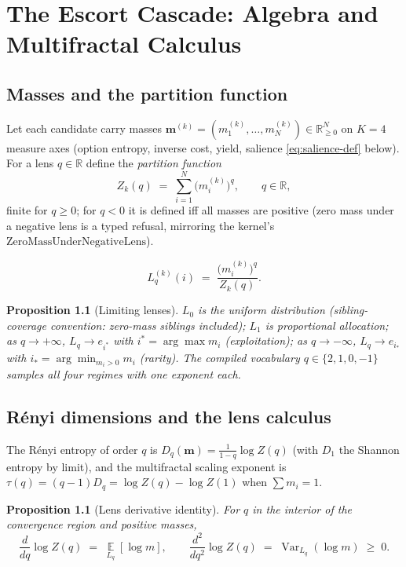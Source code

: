 \documentclass[12pt,oneside]{report}
\theoremstyle{plain}
\newtheorem{proposition}[theorem]{Proposition}
\theoremstyle{definition}
\theoremstyle{remark}
\newcommand{\R}{\mathbb{R}}
\newcommand{\E}{\operatorname*{\mathbb{E}}}
\newcommand{\Var}{\operatorname{Var}}
\newcommand{\escort}[1]{L_{#1}}
\newcommand{\mass}{\mathbf{m}}
\begin{document}
\chapter{The Escort Cascade: Algebra and Multifractal Calculus}
\label{ch:escort}

\section{Masses and the partition function}

Let each candidate carry masses
$\mass^{(k)}=(m^{(k)}_1,\dots,m^{(k)}_N)\in\R_{\ge0}^N$ on $K=4$
measure axes (option entropy, inverse cost, yield, salience
\eqref{eq:salience-def} below). For a lens $q\in\R$ define the
\emph{partition function}
\begin{equation}
Z_k(q) \;=\; \sum_{i=1}^{N} \bigl(m^{(k)}_i\bigr)^{q},
\qquad q\in\R,
\end{equation}
finite for $q\ge 0$; for $q<0$ it is defined iff all masses are
positive (zero mass under a negative lens is a typed refusal, mirroring
the kernel's $\mathrm{ZeroMassUnderNegativeLens}$).

\begin{equation}
\escort{q}^{(k)}(i) \;=\; \frac{\bigl(m^{(k)}_i\bigr)^{q}}{Z_k(q)}.
\label{eq:escort-def}
\end{equation}

\begin{proposition}[Limiting lenses]
$\escort{0}$ is the uniform distribution (sibling-coverage convention:
zero-mass siblings included); $\escort{1}$ is proportional allocation;
as $q\to+\infty$, $\escort{q}\to e_{i^\ast}$ with
$i^\ast=\arg\max m_i$ (exploitation); as $q\to-\infty$,
$\escort{q}\to e_{i_\ast}$ with $i_\ast=\arg\min_{m_i>0} m_i$
(rarity). The compiled vocabulary $q\in\{2,1,0,-1\}$ samples all four
regimes with one exponent each.
\end{proposition}

\section{R\'enyi dimensions and the lens calculus}

The R\'enyi entropy of order $q$ is
$D_q(\mass) = \frac{1}{1-q}\log Z(q)$ (with $D_1$ the Shannon entropy
by limit), and the multifractal scaling exponent is $\tau(q) =
(q-1)D_q = \log Z(q) - \log Z(1)$ when $\sum m_i = 1$.

\begin{proposition}[Lens derivative identity]
\label{prop:lens-derivative}
For $q$ in the interior of the convergence region and positive masses,
\begin{equation}
\frac{d}{dq}\log Z(q) \;=\; \E_{\escort{q}}\!\left[\log m\right],
\qquad
\frac{d^2}{dq^2}\log Z(q) \;=\; \Var_{\escort{q}}(\log m)\;\ge\;0 .
\end{equation}
\end{proposition}
\end{document}
